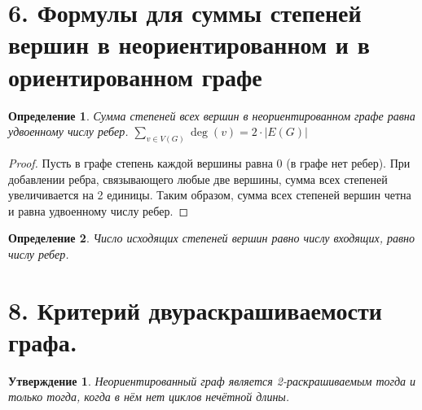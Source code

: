 \documentclass[a4paper,12pt]{article}
\newtheorem*{defin}{Определение}
\newtheorem*{Statements}{Утверждение}
\begin{document}
    \section*{6. Формулы для суммы степеней вершин в неориентированном и в ориентированном графе}

    \begin{defin}
        Сумма степеней всех вершин в неориентированном графе равна удвоенному числу ребер. $\displaystyle\sum_{v \in V(G)} \deg(v) = 2 \cdot |E(G)|$
    \end{defin}
    \begin{proof}
        Пусть в графе степень каждой вершины равна $0$ (в графе нет ребер). При добавлении ребра, связывающего любые две вершины, сумма всех степеней увеличивается на 2 единицы. Таким образом, сумма всех степеней вершин четна и равна удвоенному числу ребер.
    \end{proof}
    \begin{defin}
        Число исходящих степеней вершин равно числу входящих, равно числу ребер.
    \end{defin}

        \section*{8. Критерий двураскрашиваемости графа.}
    \begin{Statements}
        Неориентированный граф является 2-раскрашиваемым тогда и только тогда,
        когда в нём нет циклов нечётной длины.
    \end{Statements}
\end{document}
